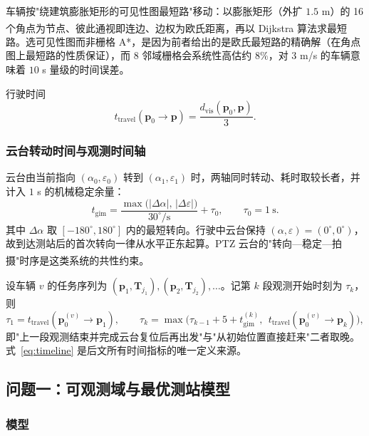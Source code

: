 \documentclass[UTF8,a4paper,zihao=-4,oneside]{ctexart}
\newcommand{\upcite}[1]{\textsuperscript{\cite{#1}}}
\begin{document}
车辆按"绕建筑膨胀矩形的可见性图最短路"移动\cite{lozano1979,kapoor1988vis}：以膨胀矩形（外扩 $1.5$ m）的 16 个角点为节点、彼此通视即连边、边权为欧氏距离，再以 Dijkstra 算法\upcite{dijkstra1959}求最短路。选可见性图而非栅格 A*，是因为前者给出的是欧氏最短路的精确解（在角点图上最短路的性质保证），而 $8$ 邻域栅格会系统性高估约 $8\%$，对 $3$ m/s 的车辆意味着 $10$ s 量级的时间误差。

行驶时间
\begin{equation}
\label{eq:travel}
t_{\mathrm{travel}}(\bm{p}_0\to\bm{p})=\frac{d_{\mathrm{vis}}(\bm{p}_0,\bm{p})}{3}.
\end{equation}

\subsubsection{云台转动时间与观测时间轴}

云台由当前指向 $(\alpha_0,\varepsilon_0)$ 转到 $(\alpha_1,\varepsilon_1)$ 时，两轴同时转动、耗时取较长者，并计入 $1$ s 的机械稳定余量：
\begin{equation}
\label{eq:gimbal}
t_{\mathrm{gim}}=\frac{\max\big(|\Delta\alpha|,\,|\Delta\varepsilon|\big)}{30^\circ/\mathrm{s}}+\tau_0,
\qquad \tau_0=1\ \mathrm{s}.
\end{equation}
其中 $\Delta\alpha$ 取 $[-180^\circ,180^\circ]$ 内的最短转向。行驶中云台保持 $(\alpha,\varepsilon)=(0^\circ,0^\circ)$，故到达测站后的首次转向一律从水平正东起算。PTZ 云台的"转向—稳定—拍摄"时序是这类系统的共性约束\upcite{kumar2009ptz,sasiadek2008vision}。

设车辆 $v$ 的任务序列为 $(\bm{p}_1,\bm{T}_{j_1}),(\bm{p}_2,\bm{T}_{j_2}),\dots$。记第 $k$ 段观测开始时刻为 $\tau_k$，则
\begin{equation}
\label{eq:timeline}
\tau_1=t_{\mathrm{travel}}(\bm{p}_0^{(v)}\to\bm{p}_1),\qquad
\tau_{k}=\max\Big(\tau_{k-1}+5+t_{\mathrm{gim}}^{(k)},\ \ t_{\mathrm{travel}}(\bm{p}_0^{(v)}\to\bm{p}_k)\Big),
\end{equation}
即"上一段观测结束并完成云台复位后再出发"与"从初始位置直接赶来"二者取晚。式~\eqref{eq:timeline} 是后文所有时间指标的唯一定义来源。

\subsection{问题一：可观测域与最优测站模型}

\subsubsection{模型}
\end{document}
